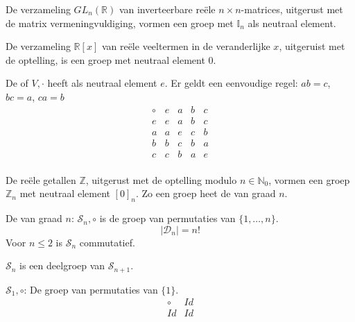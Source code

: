 \documentclass[main.tex]{subfiles}
\begin{document}
\begin{vb}
  De verzameling $GL_{n}(\mathbb{R})$ van inverteerbare re\"ele $n\times n$-matrices, uitgerust met de matrix vermeningvuldiging, vormen een groep met $\mathbb{I}_{n}$ als neutraal element.
\end{vb}

\begin{vb}
  De verzameling $\mathbb{R}[x]$ van re\"ele veeltermen in de veranderlijke $x$, uitgeruist met de optelling, is een groep met neutraal element $0$.\\
\commj
\end{vb}

\begin{de}
  De  of  $V,\cdot$ heeft als neutraal element $e$.
  Er geldt een eenvoudige regel: $ab = c$, $bc = a$, $ca = b$
  \[
  \begin{array}{c|cccc}
    \circ & e & a & b & c \\
    \hline
    e & e & a & b & c \\
    a & a & e & c & b \\
    b & b & c & b & a \\
    c & c & b & a & e \\
  \end{array}
  \]
\commj
\end{de}

\begin{vb}
  De re\"ele getallen $\mathbb{Z}$, uitgerust met de optelling modulo $n\in \mathbb{N}_{0}$, vormen een groep $\mathbb{Z}_{n}$ met neutraal element $[0]_{n}$. Zo een groep heet de  van graad $n$.
\commj
\end{vb}

\begin{de}
  De  van graad $n$: $\mathcal{S}_{n},\circ$ is de groep van permutaties van $\{ 1,\dotsc,n \}$.
  \[ |\mathcal{D}_{n}| = n! \]
  Voor $n \le 2$ is $\mathcal{S}_{n}$ commutatief.
\end{de}

\begin{ei}
  $\mathcal{S}_{n}$ is een deelgroep van $\mathcal{S}_{n+1}$.
\end{ei}

\begin{vb}
  $\mathcal{S}_{1},\circ$: De groep van permutaties van $\{ 1 \}$.\\
  \[
  \begin{array}{c|c}
    \circ & Id \\
    \hline
    Id & Id\\
  \end{array}
  \]
\commj
\end{vb}
\end{document}
